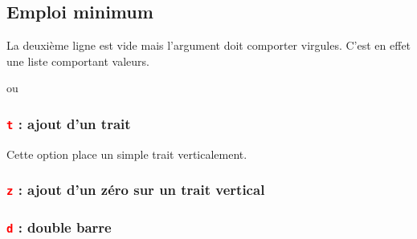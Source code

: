 \subsection{Emploi minimum}
La deuxième ligne est vide mais l'argument  doit comporter  virgules. C'est en effet une liste comportant  valeurs.

\begin{tkzexample}
 \tkzTabLine{,,,,} ou \tkzTabLine{ , , , , }\end{tkzexample}

\begin{tkzexample}[width=8cm,small]
\end{tkzexample}

\subsubsection{\texttt{\textcolor{red}{t}} : ajout d'un trait}
Cette option place un simple trait verticalement.
\begin{tkzexample}[width=8cm,small]
\end{tkzexample}

\subsubsection{\texttt{\textcolor{red}{z}} : ajout d'un zéro sur un trait vertical}
\begin{tkzexample}[width=8cm,small]
\end{tkzexample}

\subsubsection{\texttt{\textcolor{red}{d}} : double barre}

